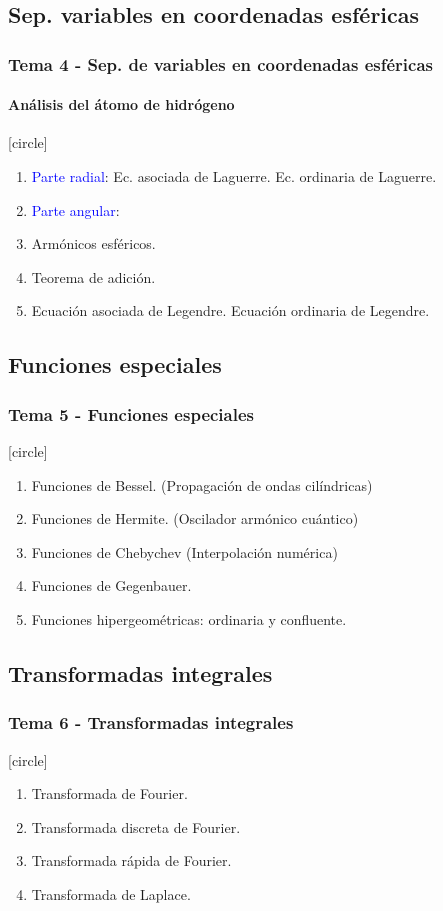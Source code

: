 \subsection{Sep. variables en coordenadas esféricas}
\begin{frame}
\frametitle{Tema 4 - Sep. de variables en coordenadas esféricas}
\framesubtitle{Análisis del átomo de hidrógeno}
[circle]
\begin{enumerate}[<+->]
\item \textcolor{blue}{Parte radial}: Ec. asociada de Laguerre. Ec. ordinaria de Laguerre.
\item \textcolor{blue}{Parte angular}:
\item Armónicos esféricos.
\item Teorema de adición.
\item Ecuación asociada de Legendre. Ecuación ordinaria de Legendre.
\end{enumerate}
\end{frame}
\subsection{Funciones especiales}
\begin{frame}
\frametitle{Tema 5 - Funciones especiales}
[circle]
\begin{enumerate}[<+->]
\item Funciones de Bessel. (Propagación de ondas cilíndricas)
\item Funciones de Hermite. (Oscilador armónico cuántico)
\item Funciones de Chebychev (Interpolación numérica)
\item Funciones de Gegenbauer. 
\item Funciones hipergeométricas: ordinaria y confluente.
\end{enumerate}
\end{frame}
\subsection{Transformadas integrales}
\begin{frame}
\frametitle{Tema 6 - Transformadas integrales}
[circle]
\begin{enumerate}[<+->]
\item Transformada de Fourier.
\item Transformada discreta de Fourier.
\item Transformada rápida de Fourier.
\item Transformada de Laplace.
\end{enumerate}
\end{frame}

